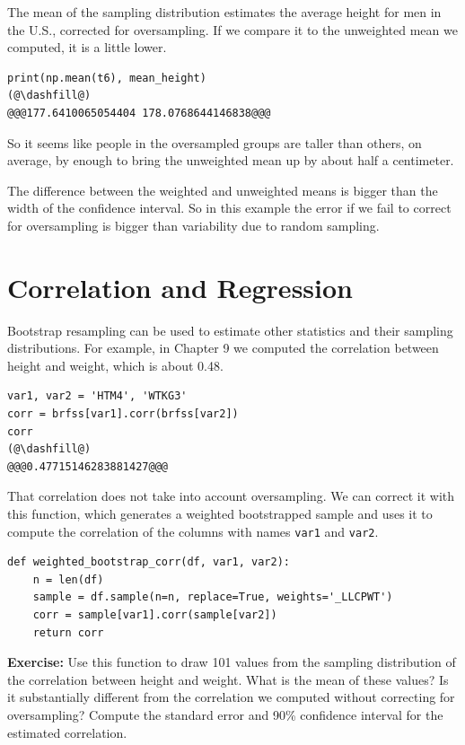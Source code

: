 The mean of the sampling distribution estimates the average height for
men in the U.S., corrected for oversampling. If we compare it to the
unweighted mean we computed, it is a little lower.

\begin{lstlisting}[]
print(np.mean(t6), mean_height)
(@\dashfill@)
@@@177.6410065054404 178.0768644146838@@@
\end{lstlisting}

So it seems like people in the oversampled groups are taller than
others, on average, by enough to bring the unweighted mean up by about
half a centimeter.

The difference between the weighted and unweighted means is bigger than
the width of the confidence interval. So in this example the error if we
fail to correct for oversampling is bigger than variability due to
random sampling.

\hypertarget{correlation-and-regression}{%
\section{Correlation and Regression}\label{correlation-and-regression}}

Bootstrap resampling can be used to estimate other statistics and their
sampling distributions. For example, in Chapter 9 we computed the
correlation between height and weight, which is about 0.48.

\begin{lstlisting}[]
var1, var2 = 'HTM4', 'WTKG3'
corr = brfss[var1].corr(brfss[var2])
corr
(@\dashfill@)
@@@0.47715146283881427@@@
\end{lstlisting}

That correlation does not take into account oversampling. We can correct
it with this function, which generates a weighted bootstrapped sample
and uses it to compute the correlation of the columns with names
\passthrough{\lstinline!var1!} and \passthrough{\lstinline!var2!}.

\begin{lstlisting}[]
def weighted_bootstrap_corr(df, var1, var2):
    n = len(df)
    sample = df.sample(n=n, replace=True, weights='_LLCPWT')
    corr = sample[var1].corr(sample[var2])
    return corr
\end{lstlisting}

\textbf{Exercise:} Use this function to draw 101 values from the
sampling distribution of the correlation between height and weight. What
is the mean of these values? Is it substantially different from the
correlation we computed without correcting for oversampling? Compute the
standard error and 90\% confidence interval for the estimated
correlation.

